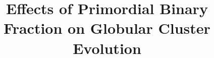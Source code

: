 \documentclass[twocolumn]{aastex62}
\begin{document}

\title{Effects of Primordial Binary Fraction on Globular Cluster Evolution}


\end{document}
